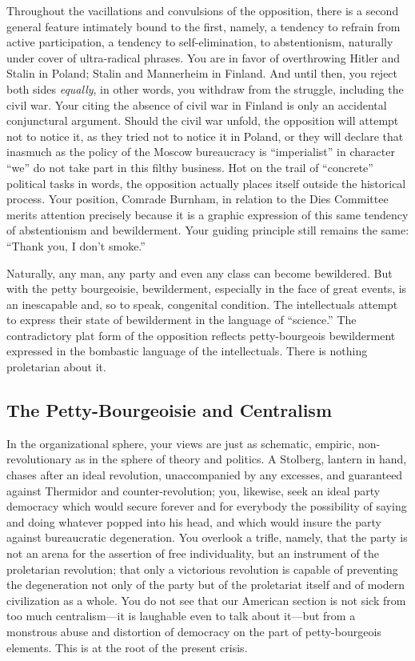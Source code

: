 Throughout the vacillations and convulsions of the opposition, there is a second general feature intimately bound to the first, namely, a tendency to refrain from active participation, a tendency to self-elimination, to abstentionism, naturally under cover of ultra-radical phrases. You are in favor of overthrowing Hitler and Stalin in Poland; Stalin and Mannerheim in Finland. And until then, you reject both sides \emph{equally}, in other words, you withdraw from the struggle, including the civil war. Your citing the absence of civil war in Finland is only an accidental conjunctural argument. Should the civil war unfold, the opposition will attempt not to notice it, as they tried not to notice it in Poland, or they will declare that inasmuch as the policy of the Moscow bureaucracy is “imperialist” in character “we” do not take part in this filthy business. Hot on the trail of “concrete” political tasks in words, the opposition actually places itself outside the historical process. Your position, Comrade Burnham, in relation to the Dies Committee merits attention precisely because it is a graphic expression of this same tendency of abstentionism and bewilderment. Your guiding principle still remains the same: “Thank you, I don’t smoke.”

Naturally, any man, any party and even any class can become bewildered. But with the petty bourgeoisie, bewilderment, especially in the face of great events, is an inescapable and, so to speak, congenital condition. The intellectuals attempt to express their state of bewilderment in the language of “science.” The contradictory plat form of the opposition reflects petty-bourgeois bewilderment expressed in the bombastic language of the intellectuals. There is nothing proletarian about it.

\subsection*{The Petty-Bourgeoisie and Centralism}

In the organizational sphere, your views are just as schematic, empiric, non-revolutionary as in the sphere of theory and politics. A Stolberg, lantern in hand, chases after an ideal revolution, unaccompanied by any excesses, and guaranteed against Thermidor and counter-revolution; you, likewise, seek an ideal party democracy which would secure forever and for everybody the possibility of saying and doing whatever popped into his head, and which would insure the party against bureaucratic degeneration. You overlook a trifle, namely, that the party is not an arena for the assertion of free individuality, but an instrument of the proletarian revolution; that only a victorious revolution is capable of preventing the degeneration not only of the party but of the proletariat itself and of modern civilization as a whole. You do not see that our American section is not sick from too much centralism---it is laughable even to talk about it---but from a monstrous abuse and distortion of democracy on the part of petty-bourgeois elements. This is at the root of the present crisis.

